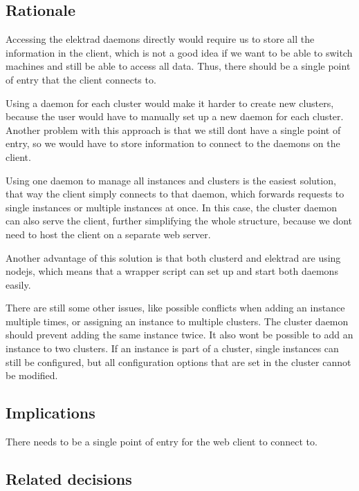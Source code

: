 \subsection*{Rationale}

Accessing the elektrad daemons directly would require us to store all the information in the client, which is not a good idea if we want to be able to switch machines and still be able to access all data. Thus, there should be a single point of entry that the client connects to.

Using a daemon for each cluster would make it harder to create new clusters, because the user would have to manually set up a new daemon for each cluster. Another problem with this approach is that we still don\textquotesingle{}t have a single point of entry, so we would have to store information to connect to the daemons on the client.

Using one daemon to manage all instances and clusters is the easiest solution, that way the client simply connects to that daemon, which forwards requests to single instances or multiple instances at once. In this case, the cluster daemon can also serve the client, further simplifying the whole structure, because we don\textquotesingle{}t need to host the client on a separate web server.

Another advantage of this solution is that both clusterd and elektrad are using nodejs, which means that a wrapper script can set up and start both daemons easily.

There are still some other issues, like possible conflicts when adding an instance multiple times, or assigning an instance to multiple clusters. The cluster daemon should prevent adding the same instance twice. It also won\textquotesingle{}t be possible to add an instance to two clusters. If an instance is part of a cluster, single instances can still be configured, but all configuration options that are set in the cluster cannot be modified.

\subsection*{Implications}


\begin{DoxyItemize}
\item There needs to be a single point of entry for the web client to connect to.
\end{DoxyItemize}

\subsection*{Related decisions}


